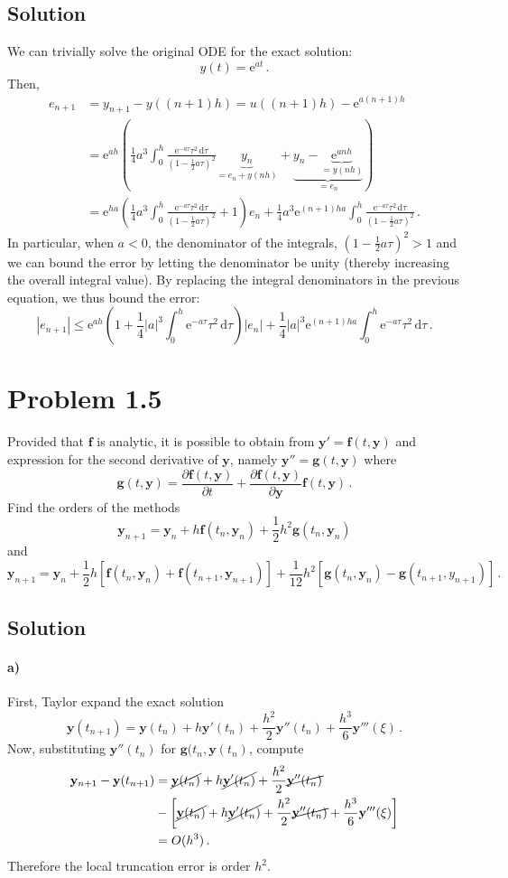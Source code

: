 \documentclass[10pt,letterpaper]{article}
\def\mbf{\mathbf}
\providecommand{\abs}[1]{\left\lvert#1\right\rvert}
\def\d{\mathrm{d}}
\def\e{\mathrm{e}}
\def\y{\mathbf{y}}
\def\f{\mathbf{f}}
\begin{document}
\subsection*{Solution}
We can trivially solve the original ODE for the exact solution:
\[
y(t)=\e^{at}\,.
\]
Then,
\begin{align*}
e_{n+1}&=y_{n+1}-y((n+1)h)=u((n+1)h)-\e^{a(n+1)h}\\
&=\e^{ah}\left(\frac{1}{4}a^3\int_0^h\frac{\e^{-a\tau}\tau^2\,\d\tau}{(1-\frac{1}{2}a\tau)^2}\underbrace{y_n}_{\displaystyle=e_n+y(nh)}
+\underbrace{y_n-\underbrace{\e^{anh}}_{\displaystyle=y(nh)}}_{\displaystyle=e_n}\right)\\
&=\e^{ha}\left(\frac{1}{4}a^3\int_0^h\frac{\e^{-a\tau}\tau^2\,\d\tau}{(1-\frac{1}{2}a\tau)^2}+1\right)e_n
+\frac{1}{4}a^3\e^{(n+1)ha}\int_0^h\frac{\e^{-a\tau}\tau^2\,\d\tau}{(1-\frac{1}{2}a\tau)^2}\,.
\end{align*}
In particular, when $a<0$, the denominator of the integrals, $(1-\frac{1}{2}a\tau)^2 > 1$ and we can bound the error by 
letting the denominator be unity (thereby increasing the overall integral value). By replacing the integral denominators in the previous equation, 
we thus bound the error:
\[
\abs{e_{n+1}}\leq \e^{ah}\left(1+\frac{1}{4}\abs{a}^3\int_0^h\e^{-a\tau}\tau^2\,\d\tau\right)\abs{e_n}
+\frac{1}{4}\abs{a}^3\e^{(n+1)ha}\int_0^h\e^{-a\tau}\tau^2\,\d\tau\,.
\]
\section*{Problem 1.5}
Provided that $\mbf{f}$ is analytic, it is possible to obtain from $\mbf{y}'=\mbf{f}(t,\mbf{y})$ and expression for the second derivative of $\mbf{y}$, 
namely $\mbf{y}''=\mbf{g}(t,\mbf{y})$ where
\[
\mbf{g}(t,\mbf{y})=\frac{\partial\mbf{f}(t,\mbf{y})}{\partial t}+\frac{\partial\mbf{f}(t,\mbf{y})}{\partial\mbf{y}}\mbf{f}(t,\mbf{y})\,.
\]
Find the orders of the methods
\[
\y_{n+1}=\y_n+h\f(t_n,\y_n)+\frac{1}{2}h^2\mbf{g}(t_n,\y_n)
\]
and
\[
\y_{n+1}=\y_n+\frac{1}{2}h\left[\f(t_n,\y_n)+\f(t_{n+1},\y_{n+1})\right]
+\frac{1}{12}h^2\left[\mbf{g}(t_n,\y_n)-\mbf{g}(t_{n+1},y_{n+1})\right]\,.
\]
\subsection*{Solution}
\paragraph*{a)} First, Taylor expand the exact solution
\[
\y(t_{n+1})=\y(t_n)+h\y'(t_n)+\frac{h^2}{2}\y''(t_n)+\frac{h^3}{6}\y'''(\xi)\,.
\]
Now, substituting $\y''(t_n)$ for $\mbf{g}(t_n,\y(t_n)$, compute
\begin{align*}
\y_{n+1}-\y(t_{n+1})&=\cancel{\y(t_n)}+h\cancel{\y'(t_n)}+\frac{h^2}{2}\cancel{\y''(t_n)}\\
&-\left[\cancel{\y(t_n)}+h\cancel{\y'(t_n)}+\frac{h^2}{2}\cancel{\y''(t_n)}+\frac{h^3}{6}\y'''(\xi)\right]\\
&=O(h^3)\,.
\end{align*}
Therefore the local truncation error is order $h^2$.
\end{document}
